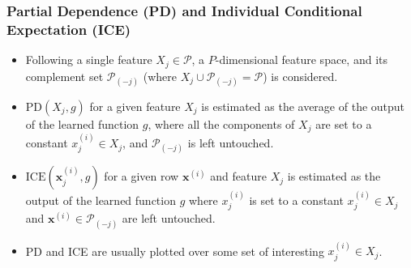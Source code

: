 \documentclass[11pt, 
               aspectratio=169
               ]{beamer}
\begin{document}
		\begin{frame}
		
			\frametitle{Partial Dependence (PD) and Individual Conditional Expectation (ICE)}
			
				\vspace{-10 pt}
			
				\begin{itemize}
					
					\item Following \cite{esl} a single feature $X_j \in \mathcal{P}$, a $P$-dimensional feature space,  and its complement set $\mathcal{P}_{(-j)}$ (where $X_j \cup \mathcal{P}_{(-j)} = \mathcal{P}$) is considered.
					
					\item $\text{PD}(X_j, g)$ for a given feature $X_j$ is estimated as the average of the output of the learned function $g$, where all the components of $X_j$ are set to a constant $x^{(i)}_j \in X_j$, and $\mathcal{P}_{(-j)}$ is left untouched.
					
					\item $\text{ICE}(\mathbf{x}^{(i)}_j, g)$ for a given row $\mathbf{x}^{(i)}$ and feature $X_j$ is estimated as the output of the learned function $g$ where $x^{(i)}_j$ is set to a constant $x^{(i)}_j \in X_j$ and $\mathbf{x}^{(i)} \in\mathcal{P}_{(-j)}$ are left untouched.
					
					\item PD and ICE are usually plotted over some set of interesting $x^{(i)}_j \in X_j$. 
				
				\end{itemize}
			
		\end{frame}
	
\end{document}
